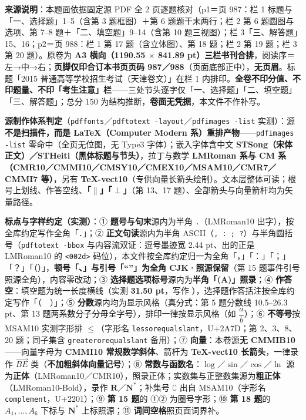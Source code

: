 


\begin{gktip}
\textbf{来源说明}：本题面依据固定源 PDF 全 2 页逐题核对（p1＝页 987：栏 1 标题与「一、选择题」1–5（含第 3 题框图）＋第 6 题题干末两行；栏 2 第 6 题圆图与选项、第 7–8 题＋「二、填空题」9–14（含第 10 题三视图）；栏 3「三、解答题」15、16；p2＝页 988：栏 1 第 17 题（含立体图）、第 18 题；栏 2 第 19 题；栏 3 第 20 题）。原卷为 \textbf{A3 横向（1190.55 \(\times\) 841.89 pt）三栏书刊合排}，阅读序＝左→中→右；\textbf{页脚仅印合订本书页页码 987／988}（页面底部正中），\textbf{无页眉}。标题「2015 普通高等学校招生考试（天津卷文）」在栏 1 内排印。\textbf{全卷不印分值、不印题量、不印「考生注意」栏}——三处节头逐字仅「一、选择题」「二、填空题」「三、解答题」；总分 150 为结构推断，\textbf{卷面无凭据}，本文件不作补写。

\textbf{源制作体系判定}（\texttt{pdffonts}／\texttt{pdftotext -layout}／\texttt{pdfimages -list} 实测）：源\textbf{不是扫描件，而是 LaTeX（Computer Modern 系）重排产物}——\texttt{pdfimages -list} 零命中（全页无位图，无 Type3 字体）；嵌入字体含中文 \textbf{STSong（宋体正文）／STHeiti（黑体标题与节头）}，拉丁与数学 \textbf{LMRoman 系与 CM 系（CMR10／CMMI10／CMSY10／CMEX10／MSAM10／CMR7／CMMI7 等）}，另有 \textbf{TeX-vect10}（专供向量长箭头绘制）。文本层整体可读；根号上划线、作答空线、\textbf{「$\parallel$」「$\perp$」}（第 13、17 题）、全部箭头与向量箭杆均为矢量路径。

\textbf{标点与字样约定（实测）}：① \textbf{题号与句末}源内为半角 \texttt{.}（LMRoman10 出字），按全库约定写作全角「．」；② \textbf{正文句读}源内为半角 ASCII（\texttt{, : ; ?}）与半角圆括号（\texttt{pdftotext -bbox} 与内容流双证：逗号墨迹宽 2.44 pt、出的正是 LMRoman10 的 \texttt{<002d>} 码位），本文件按全库约定归一为全角「，」「：」「；」「？」「（）」，\textbf{顿号「、」与引号「“”」为全角 CJK·照源保留}（第 15 题事件引号照源全角），内容零改动；③ \textbf{选择题选项标号}源内为\textbf{半角「(A)」照录}；④ \textbf{作答空}：填空题为统一长度横线（实测 \textbf{31.50 pt}，写作 \texttt{\gkblank{}}），选择题作答括注按全库约定写作「（　）」；⑤ \textbf{分数}源内均为显示风格（真分式：第 5 题分数线 10.5–26.3 pt、第 13 题两系数分子分母全字号），排印一律按显示风格（如 \(\dfrac{a}{b}\)）；⑥ \textbf{不等号}按 MSAM10 实测字形排 \(\leqslant\)（字形名 \texttt{lessorequalslant}，U+2A7D；第 2、3、8、20 题；同子集含 \texttt{greaterorequalslant} 备用）；⑦ \textbf{向量}：本卷源\textbf{无 CMMIB10}——向量字母为 \textbf{CMMI10 常规数学斜体}、箭杆为 \textbf{TeX-vect10 长箭头}，一律录作 \(\overrightarrow{BE}\) 类（\textbf{不加粗斜体向量记号}）；⑧ \textbf{常数与函数名}：\(\log\)／\(\sin\)／\(\cos\)／\(\ln\) 源为\textbf{正体}（LMRoman10／CMR10），照录正体；实数集与正整数集源为\textbf{粗正体}（LMRoman10-Bold），录作 \(\mathbf{R}\)／\(\mathbf{N}^*\)；补集号 \(\complement\) 出自 MSAM10（字形名 \texttt{complement}，U+2201）；⑨ \textbf{第 15 题}的 ①② 为圈号字形；⑩ \textbf{第 18 题}的 \(A_1,\dots,A_6\) 下标与 \(\mathbf{N}^*\) 上标照源；⑪ \textbf{词间空格}照页面词界补。


\end{gktip}
